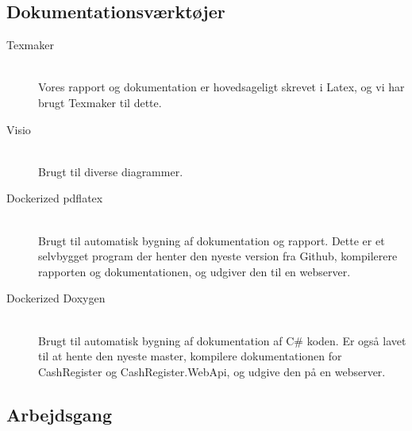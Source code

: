 \subsection{Dokumentationsværktøjer}
\begin{description}
  \item[Texmaker] \hfill \\
  Vores rapport og dokumentation er hovedsageligt skrevet i Latex, og vi har brugt Texmaker til dette.
  \item[Visio] \hfill \\
  Brugt til diverse diagrammer.
  \item[Dockerized pdflatex] \hfill \\
  Brugt til automatisk bygning af dokumentation og rapport. Dette er et selvbygget program der henter den nyeste version fra Github, kompilerere rapporten og dokumentationen, og udgiver den til en webserver.
  \item[Dockerized Doxygen] \hfill \\
  Brugt til automatisk bygning af dokumentation af C\# koden. Er også lavet til at hente den nyeste master, kompilere dokumentationen for CashRegister og CashRegister.WebApi, og udgive den på en webserver.
\end{description}

\subsection{Arbejdsgang}

